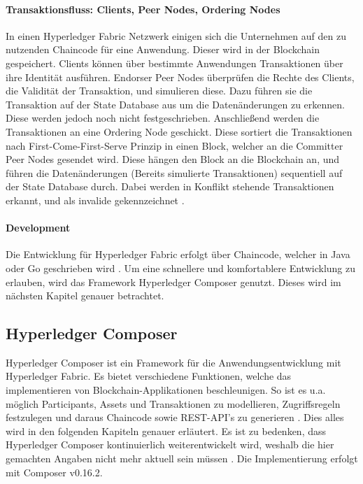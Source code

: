 \paragraph{Transaktionsfluss: Clients, Peer Nodes, Ordering Nodes}
In einen Hyperledger Fabric Netzwerk einigen sich die Unternehmen auf den zu nutzenden Chaincode für eine Anwendung. Dieser wird in der Blockchain gespeichert. Clients können über bestimmte Anwendungen Transaktionen über ihre Identität ausführen. Endorser Peer Nodes überprüfen die Rechte des Clients, die Validität der Transaktion, und simulieren diese. Dazu führen sie die Transaktion auf der State Database aus um die Datenänderungen zu erkennen. Diese werden jedoch noch nicht festgeschrieben. Anschließend werden die Transaktionen an eine Ordering Node geschickt. Diese sortiert die Transaktionen nach First-Come-First-Serve Prinzip in einen Block, welcher an die Committer Peer Nodes gesendet wird. Diese hängen den Block an die Blockchain an, und führen die Datenänderungen (Bereits simulierte Transaktionen) sequentiell auf der State Database durch. Dabei werden in Konflikt stehende Transaktionen erkannt, und als invalide gekennzeichnet \cite{SchererPerformanceScalabilityBlockchain2017}.

\paragraph{Development}
Die Entwicklung für Hyperledger Fabric erfolgt über Chaincode, welcher in Java oder Go geschrieben wird \cite{SDKsHyperledgerFabric}. Um eine schnellere und komfortablere Entwicklung zu erlauben, wird das Framework Hyperledger Composer genutzt. Dieses wird im nächsten Kapitel genauer betrachtet.


\subsection{Hyperledger Composer}
Hyperledger Composer ist ein Framework für die Anwendungsentwicklung mit Hyperledger Fabric. Es bietet verschiedene Funktionen, welche das implementieren von Blockchain-Applikationen beschleunigen. So ist es u.a. möglich Participants, Assets und Transaktionen zu modellieren, Zugriffsregeln festzulegen und daraus Chaincode sowie REST-API's zu generieren \cite{HyperledgerComposerTeamIntroductionHyperledgerComposer}. Dies alles wird in den folgenden Kapiteln genauer erläutert. Es ist zu bedenken, dass Hyperledger Composer kontinuierlich weiterentwickelt wird, weshalb die hier gemachten Angaben nicht mehr aktuell sein müssen \cite{HyperledgerComposerReleases2018}. Die Implementierung erfolgt mit Composer v0.16.2.


